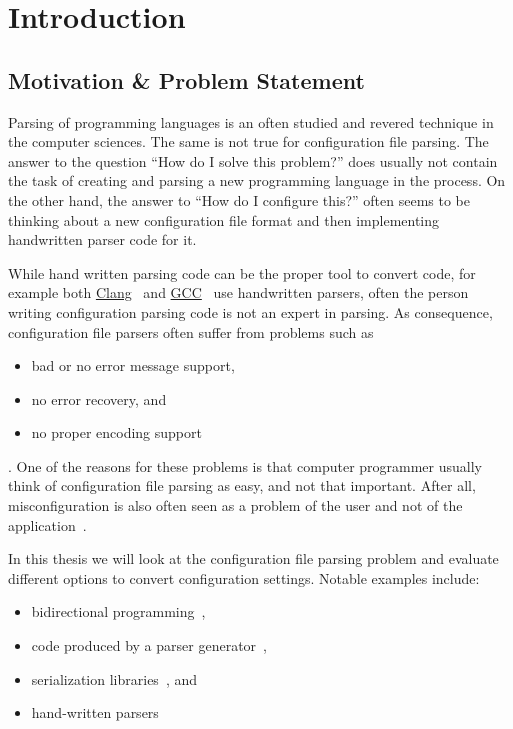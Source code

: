 \chapter{Introduction}

\section{Motivation \& Problem Statement}

Parsing of programming languages is an often studied and revered technique in the computer sciences. The same is not true for configuration file parsing. The answer to the question “How do I solve this problem?” does usually not contain the task of creating and parsing a new programming language in the process. On the other hand, the answer to “How do I configure this?” often seems to be thinking about a new configuration file format and then implementing handwritten parser code for it.

While hand written parsing code can be the proper tool to convert code, for example both \href{http://clang.llvm.org}{Clang}~\cite{bendersky2012clang} and \href{http://gcc.gnu.org}{GCC}~\cite{myers2008cparser} use handwritten parsers, often the person writing configuration parsing code is not an expert in parsing. As consequence, configuration file parsers often suffer from problems such as

\begin{itemize}
  \item bad or no error message support,
  \item no error recovery, and
  \item no proper encoding support
\end{itemize}

. One of the reasons for these problems is that computer programmer usually think of configuration file parsing as easy, and not that important. After all, misconfiguration is also often seen as a problem of the user and not of the application~\cite{xu2013not}.

In this thesis we will look at the configuration file parsing problem and evaluate different options to convert configuration settings. Notable examples include:

\begin{itemize}
  \item bidirectional programming~\cite{foster2005combinators, bohannon2006relational, lutterkort2008augeas, ko2016bigul, raab2016improving},
  \item code produced by a parser generator~\cite{denny2008ielr, parr2014adaptive, warth2016modular, bates2017aprt},
  \item serialization libraries~\cite{sumaray2012cds, pacini2015performance}, and
  \item hand-written parsers~\cite{myers2008cparser, bendersky2012clang}
\end{itemize}

